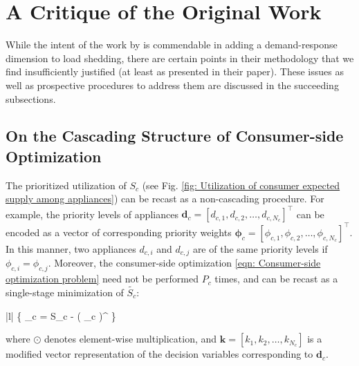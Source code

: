 \documentclass[journal, a4paper]{IEEEtran}
\begin{document}
\section{A Critique of the Original Work}
\label{sec: A Critique of the Original Work}

While the intent of the work by \cite{Jabian2020} is commendable in adding a demand-response dimension to load shedding,
there are certain points in their methodology that we find insufficiently justified
(at least as presented in their paper).
These issues as well as prospective procedures to address them are discussed in the succeeding subsections.

\subsection{On the Cascading Structure of Consumer-side Optimization}
\label{subsec: II. On the Cascading Structure of Consumer-side Optimization}

The prioritized utilization of $S_c$ (see Fig. \ref{fig: Utilization of consumer expected supply among appliances})
can be recast as a non-cascading procedure.
For example, the priority levels of appliances
$\mathbf{d}_{c} = \left[ d_{c,1}, d_{c,2}, \ldots, d_{c,N_{c}} \right]^{\intercal}$
can be encoded as a vector of corresponding priority weights
$\bm{\phi}_{c} = \left[ \phi_{c,1}, \phi_{c,2}, \ldots, \phi_{c,N_{c}} \right]^{\intercal}$.
In this manner, two appliances $d_{c,i}$ and $d_{c,j}$ are
of the same priority levels if $\phi_{c,i} = \phi_{c,j}$.
Moreover, the consumer-side optimization \eqref{eqn: Consumer-side optimization problem}
need not be performed $P_{c}$ times,
and can be recast as a single-stage minimization of $\tilde{S_{c}}$:
\begin{maxi!}|l|
	{  }
	{ \left\{ _{c} = S_{c} - \left(  \odot {}_{c} \right)^{\intercal}  \right\} }
	{ \label{eqn: Single-stage consumer-side optimization problem} }
	{}{}
\end{maxi!}
where $\odot$ denotes element-wise multiplication,
and $\mathbf{k} = \left[k_{1}, k_{2}, \ldots, k_{N_{c}} \right]$ is a modified vector representation of the decision variables corresponding to $\mathbf{d}_{c}$.
\end{document}
